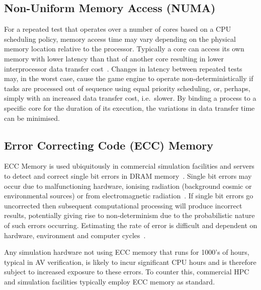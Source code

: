 \documentclass[runningheads,twocolumn,a4paper,10pt]{llncs}
\begin{document}
\subsection{Non-Uniform Memory Access (NUMA)} \label{s:sources_numa}
For a repeated test that operates over a number of cores based on a CPU scheduling policy, memory access time may vary depending on the physical memory location relative to the processor. Typically a core can access its own memory with lower latency than that of another core resulting in lower interprocessor data transfer cost~\cite{nieplocha1996global}. 
%
Changes in latency between repeated tests may, in the worst case, cause the game engine to operate non-deterministically if tasks are processed out of sequence using equal priority scheduling, or, perhaps, simply with an increased data transfer cost, i.e.\ slower. 
%
By binding a process to a specific core for the duration of its execution, the variations in data transfer time can be minimised.


\subsection{Error Correcting Code (ECC) Memory}
ECC Memory is used ubiquitously in commercial simulation facilities and servers to detect and correct single bit errors in DRAM memory~\cite{Dell1997}. Single bit errors may occur due to malfunctioning hardware, ionising radiation (background cosmic or environmental sources) or from electromagnetic radiation~\cite{dodd2003basic}. If single bit errors go uncorrected then subsequent computational processing will produce incorrect results, potentially giving rise to non-determinism due to the probabilistic nature of such errors occurring. Estimating the rate of error is difficult and dependent on hardware, environment and computer cycles~\cite{mielke2008bit}.

Any simulation hardware not using ECC memory that runs for 1000's of hours, typical in AV verification, is likely to incur significant CPU hours and is therefore subject to increased exposure to these errors. To counter this, commercial HPC and simulation facilities typically employ ECC memory as standard.

\end{document}
